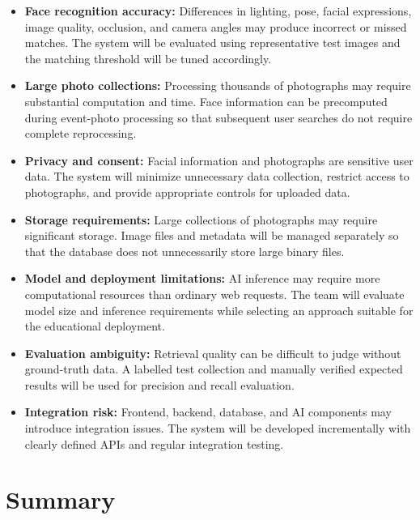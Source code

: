 \documentclass[11pt,a4paper]{article}
\begin{document}
\begin{itemize}[leftmargin=0.7cm]

    \item \textbf{Face recognition accuracy:} Differences in lighting,
    pose, facial expressions, image quality, occlusion, and camera
    angles may produce incorrect or missed matches. The system will be
    evaluated using representative test images and the matching
    threshold will be tuned accordingly.

    \item \textbf{Large photo collections:} Processing thousands of
    photographs may require substantial computation and time. Face
    information can be precomputed during event-photo processing so
    that subsequent user searches do not require complete
    reprocessing.

    \item \textbf{Privacy and consent:} Facial information and
    photographs are sensitive user data. The system will minimize
    unnecessary data collection, restrict access to photographs, and
    provide appropriate controls for uploaded data.

    \item \textbf{Storage requirements:} Large collections of
    photographs may require significant storage. Image files and
    metadata will be managed separately so that the database does not
    unnecessarily store large binary files.

    \item \textbf{Model and deployment limitations:} AI inference may
    require more computational resources than ordinary web requests.
    The team will evaluate model size and inference requirements while
    selecting an approach suitable for the educational deployment.

    \item \textbf{Evaluation ambiguity:} Retrieval quality can be
    difficult to judge without ground-truth data. A labelled test
    collection and manually verified expected results will be used for
    precision and recall evaluation.

    \item \textbf{Integration risk:} Frontend, backend, database, and
    AI components may introduce integration issues. The system will be
    developed incrementally with clearly defined APIs and regular
    integration testing.
\end{itemize}

\section{Summary}
\end{document}
